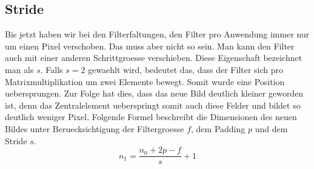 \cite{deeplearning.ai:cnn}

\subsection{Stride}
Bis jetzt haben wir bei den Filterfaltungen, den Filter pro Anwendung immer nur
um einen Pixel verschoben. Das muss aber nicht so sein. Man kann den Filter
auch mit einer anderen Schrittgroesse verschieben. Diese Eigenschaft bezeichnet
man als  $s$. Falls $s = 2$ gewaehlt wird, bedeutet das, dass der
Filter sich pro Matrixmultiplikation um zwei Elemente bewegt. Somit wurde eine
Position uebersprungen. Zur Folge hat dies, dass das neue Bild
deutlich kleiner geworden ist, denn das Zentralelement ueberspringt somit auch
diese Felder und bildet so deutlich weniger Pixel.
\para{}
Folgende Formel beschreibt die Dimensionen des neuen Bildes unter
Beruecksichtigung der Filtergroesse $f$, dem Padding $p$ und dem Stride $s$.
\\
\begin{equation}
  n_1 = \frac{n_0 + 2p - f}{s} + 1
\end{equation}

\cite{deeplearning.ai:cnn}

